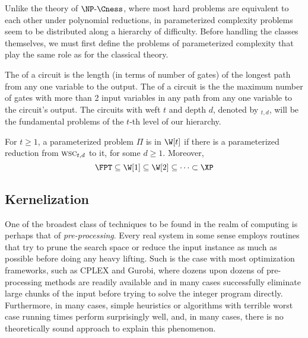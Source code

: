 Unlike the theory of $\NPcness$, where most hard problems are equivalent to each other under polynomial reductions, in parameterized complexity problems seem to be distributed along a hierarchy of difficulty.
Before handling the classes themselves, we must first define the problems of parameterized complexity that play the same role as  for the classical theory. 

The  of a circuit is the length (in terms of number of gates) of the longest path from any one variable to the output.
The  of a circuit is the the maximum number of gates with more than 2 input variables in any path from any one variable to the circuit's output.
The circuits with weft $t$ and depth $d$, denoted by $_{t,d}$, will be the fundamental problems of the $t$-th level of our hierarchy.


\begin{class_definition*}[$\W$-hierarchy]
    For $t \geq 1$, a parameterized problem $\Pi$ is in $\W[t]$ if there is a parameterized reduction from $\textsc{wsc}_{t,d}$ to it, for some $d \geq 1$. Moreover,
    \begin{equation*}
        \FPT \subseteq \W[1] \subseteq \W[2] \subseteq \cdots \subset \XP
    \end{equation*}
\end{class_definition*}


\subsection{Kernelization}

One of the broadest class of techniques to be found in the realm of computing is perhaps that of \textit{pre-processing}.
Every real system in some sense employs routines that try to prune the search space or reduce the input instance as much as possible before doing any heavy lifting.
Such is the case with most optimization frameworks, such as CPLEX and Gurobi, where dozens upon dozens of pre-processing methods are readily available and in many cases successfully eliminate large chunks of the input before trying to solve the integer program directly.
Furthermore, in many cases, simple heuristics or algorithms with terrible worst case running times perform surprisingly well, and, in many cases, there is no theoretically sound approach to explain this phenomenon.


